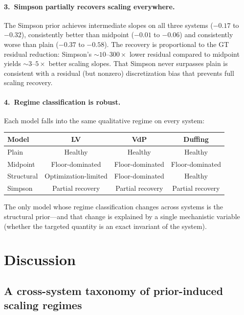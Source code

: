 \documentclass[11pt]{article}
\begin{document}
\paragraph{3.\ Simpson partially recovers scaling everywhere.}
The Simpson prior achieves intermediate slopes on all three systems ($-0.17$ to $-0.32$), consistently better than midpoint ($-0.01$ to $-0.06$) and consistently worse than plain ($-0.37$ to $-0.58$).
The recovery is proportional to the GT residual reduction: Simpson's $\sim\!10$--$300\times$ lower residual compared to midpoint yields $\sim\!3$--$5\times$ better scaling slopes.
That Simpson never surpasses plain is consistent with a residual (but nonzero) discretization bias that prevents full scaling recovery.

\paragraph{4.\ Regime classification is robust.}
Each model falls into the same qualitative regime on every system:
\begin{center}
\begin{tabular}{lccc}
\toprule
Model & LV & VdP & Duffing \\
\midrule
Plain & Healthy & Healthy & Healthy \\
Midpoint & Floor-dominated & Floor-dominated & Floor-dominated \\
Structural & Optimization-limited & Floor-dominated & Healthy \\
Simpson & Partial recovery & Partial recovery & Partial recovery \\
\bottomrule
\end{tabular}
\end{center}
The only model whose regime classification changes across systems is the structural prior---and that change is explained by a single mechanistic variable (whether the targeted quantity is an exact invariant of the system).

\section{Discussion}

\subsection{A cross-system taxonomy of prior-induced scaling regimes}
\end{document}
